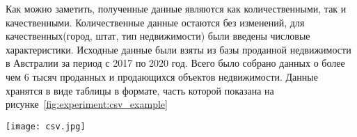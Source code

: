 Как можно заметить, полученные данные являются как количественными, так и качественными. Количественные данные остаются
без изменений, для качественных(город, штат, тип недвижимости) были введены числовые характеристики.
Исходные данные были взяты из базы проданной недвижимости в Австралии за период с 2017 по 2020 год.
Всего было собрано данных о более чем 6 тысяч проданных и продающихся объектов недвижимости. Данные хранятся в виде 
таблицы в формате, часть которой показана на рисунке~\ref{fig:experiment:csv_example}

\begin{sidewaysfigure}
  \centering
    \texttt{[image: csv.jpg]}
    \caption{Исходные данные в csv формате}
    \label{fig:experiment:csv_example}
\end{sidewaysfigure}
